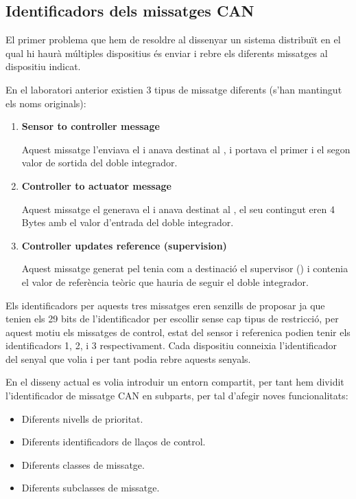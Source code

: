 \subsection{Identificadors dels missatges CAN}\label{cap:dis:idCAN}

El primer problema que hem de resoldre al dissenyar un sistema distribuït en el qual hi haurà múltiples dispositius és enviar i rebre els diferents missatges al dispositiu indicat.

En el laboratori anterior existien 3 tipus de missatge diferents (s'han mantingut els noms originals):
\begin{enumerate}
	\item \textbf{Sensor to controller message}
	
		Aquest missatge l'enviava el \Sensor i anava destinat al 
		\Controlador, i portava el primer i el segon valor de sortida 
		del doble integrador.
	\item \textbf{Controller to actuator message}
	
		Aquest missatge el generava el \Controlador i anava destinat
		al \Actuador, el seu contingut eren 4 Bytes amb el valor 
		d'entrada del doble integrador.
	\item \textbf{Controller updates reference (supervision)}
	
		Aquest missatge generat pel \Controlador tenia com a destinació el
		supervisor (\SensorActuador) i contenia el valor de referència
		teòric que hauria de seguir el doble integrador.
\end{enumerate}

Els identificadors per aquests tres missatges eren senzills de proposar ja que tenien els 29 bits de l'identificador per escollir sense cap tipus de restricció, per aquest motiu els missatges de control, estat del sensor i referenica podien tenir els identificadors 1, 2, i 3 respectivament. Cada dispositiu conneixia l'identificador del senyal que volia i per tant podia rebre aquests senyals.

En el disseny actual es volia introduir un entorn compartit, per tant hem dividit l'identificador de missatge CAN en subparts, per tal d'afegir noves funcionalitats:

 \begin{itemize}
 	\item Diferents nivells de prioritat.
 	\item Diferents identificadors de llaços de control.
 	\item Diferents classes de missatge.
 	\item Diferents subclasses de missatge. 
 \end{itemize}

